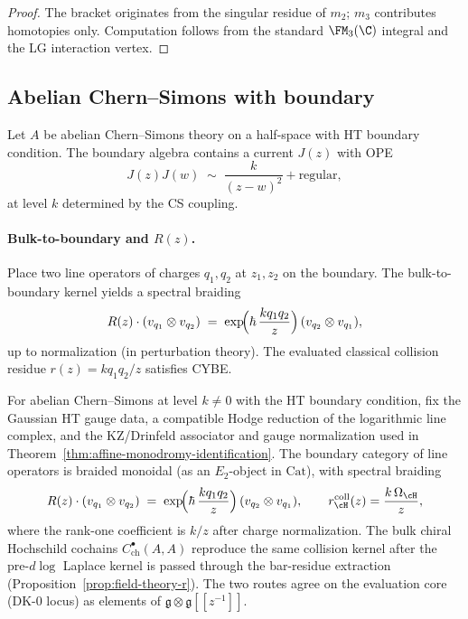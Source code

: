 \begin{proof}
The bracket originates from the singular residue of $m_2$; $m_3$ contributes homotopies only. Computation follows from the standard $\FM_3(\C)$ integral and the LG interaction vertex.
\end{proof}

\subsection{Abelian Chern--Simons with boundary}
\label{subsec:CS-abelian}
Let $A$ be abelian Chern--Simons theory on a half-space with HT boundary condition. The boundary algebra contains a current $J(z)$ with OPE
\[
J(z)J(w) \;\sim\; \frac{k}{(z-w)^2} + \text{regular},
\]
at level $k$ determined by the CS coupling.

\paragraph{Bulk-to-boundary and $R(z)$.}
Place two line operators of charges $q_1,q_2$ at $z_1,z_2$ on the boundary. The bulk-to-boundary kernel yields a spectral braiding
\[
R(z)\cdot (v_{q_1}\otimes v_{q_2}) \;=\; \exp\!\Bigl( \hbar\, \frac{k q_1 q_2}{z} \Bigr) \,(v_{q_2}\otimes v_{q_1}),
\]
up to normalization (in perturbation theory). The evaluated classical
collision residue \(r(z)=kq_1q_2/z\) satisfies CYBE.

\begin{proposition}
\label{prop:CS-R}
For abelian Chern--Simons at level $k\neq 0$ with the HT boundary
condition, fix the Gaussian HT gauge data, a compatible Hodge reduction
of the logarithmic line complex, and the KZ/Drinfeld associator and
gauge normalization used in
Theorem~\ref{thm:affine-monodromy-identification}. The boundary category
of line operators is braided monoidal (as an $E_2$-object in
$\mathrm{Cat}$), with spectral braiding
\[
 R(z)\cdot(v_{q_1}\otimes v_{q_2})\;=\;\exp\!\Bigl(\hbar\,\frac{kq_1q_2}{z}\Bigr)\,(v_{q_2}\otimes v_{q_1}),\qquad r^{\mathrm{coll}}_{\cH}(z)=\frac{k\,\Omega_{\cH}}{z},
\]
where the rank-one coefficient is $k/z$ after charge normalization.
The bulk chiral Hochschild cochains $C^{\bullet}_{\mathrm{ch}}(A,A)$ reproduce the same collision kernel after the pre-\textup{\(d\log\)} Laplace kernel is passed through the bar-residue extraction (Proposition~\ref{prop:field-theory-r}). The two routes agree on the evaluation core (DK-$0$ locus) as elements of $\mathfrak{g}\otimes\mathfrak{g}[\![z^{-1}]\!]$.
\end{proposition}

